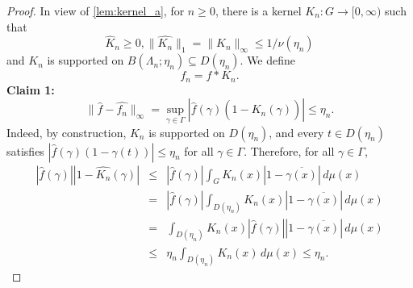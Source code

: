 \documentclass[10pt]{article}
\theoremstyle{definition}
\begin{document}
\begin{proof}
In view of \cref{lem:kernel_a}, for $n \geq 0$, there is a kernel $K_n: G \to [0, \infty)$ such that
    \[
        \widehat{K}_n \geq 0,  \| \widehat{K_n}\|_1 = \lVert K_n \rVert_{\infty} \leq 1/\nu(\eta_n)
    \]
    and $K_n$ is supported on $B(\Lambda_n; \eta_n) \subseteq D(\eta_n)$. 
    We define
    \[
        f_n = f * K_n.
    \]
	\noindent \textbf{Claim 1:} 
	\[
	\| \widehat{f} - \widehat{f_n} \|_{\infty} = \sup_{\gamma \in \Gamma} \left| \widehat{f}(\gamma) (1-\widehat{K_n}(\gamma)) \right| \leq \eta_n.
	\]
	Indeed, by construction, $K_n$ is supported on $D(\eta_n)$, and every $t \in D(\eta_n)$ satisfies $\left| \widehat{f}(\gamma) (1 - \gamma(t)) \right| \leq \eta_n$ for all $\gamma \in \Gamma$. Therefore, for all $\gamma \in \Gamma$,
	\begin{eqnarray*}
	\left| \widehat{f}(\gamma) \right| \left| 1-\widehat{K_n}(\gamma) \right| 
	&\leq& 
	\left| \widehat{f}(\gamma) \right| \int_{G} K_n(x) \left| 1-\overline{\gamma(x)} \right| \, d\mu(x) \\
	&=& \left| \widehat{f}(\gamma) \right| \int_{D(\eta_n)} K_n(x) \left| 1-\overline{\gamma(x)} \right| \, d\mu(x) \\
	&=& \int_{D(\eta_n)} K_n(x) \left| \widehat{f}(\gamma) \right| \left| 1-\overline{\gamma(x)} \right| \, d\mu(x)\\
	&\leq& \eta_n \int_{D(\eta_n)} K_n(x) \, d\mu(x) \leq \eta_n.
	\end{eqnarray*}
	

\end{proof}
\end{document}
